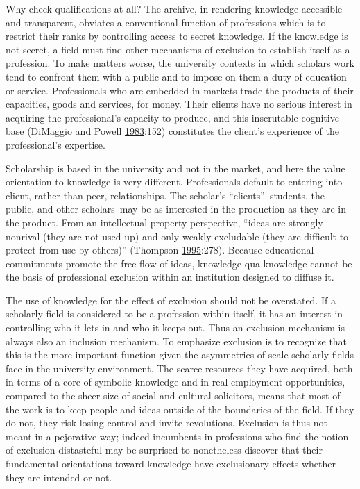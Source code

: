 \documentclass[]{book}
\theoremstyle{definition}
\theoremstyle{definition}
\theoremstyle{definition}
\theoremstyle{remark}
\begin{document}
Why check qualifications at all? The archive, in rendering knowledge
accessible and transparent, obviates a conventional function of
professions which is to restrict their ranks by controlling access to
secret knowledge. If the knowledge is not secret, a field must find
other mechanisms of exclusion to establish itself as a profession. To
make matters worse, the university contexts in which scholars work tend
to confront them with a public and to impose on them a duty of education
or service. Professionals who are embedded in markets trade the products
of their capacities, goods and services, for money. Their clients have
no serious interest in acquiring the professional's capacity to produce,
and this inscrutable cognitive base (DiMaggio and Powell
\protect\hyperlink{ref-DiMaggio1983Iron}{1983}:152) constitutes the
client's experience of the professional's expertise.

Scholarship is based in the university and not in the market, and here
the value orientation to knowledge is very different. Professionals
default to entering into client, rather than peer, relationships. The
scholar's ``clients''--students, the public, and other scholars--may be
as interested in the production as they are in the product. From an
intellectual property perspective, ``ideas are strongly nonrival (they
are not used up) and only weakly excludable (they are difficult to
protect from use by others)'' (Thompson
\protect\hyperlink{ref-Thompson1995Conceptions}{1995}:278). Because
educational commitments promote the free flow of ideas, knowledge qua
knowledge cannot be the basis of professional exclusion within an
institution designed to diffuse it.

The use of knowledge for the effect of exclusion should not be
overstated. If a scholarly field is considered to be a profession within
itself, it has an interest in controlling who it lets in and who it
keeps out. Thus an exclusion mechanism is always also an inclusion
mechanism. To emphasize exclusion is to recognize that this is the more
important function given the asymmetries of scale scholarly fields face
in the university environment. The scarce resources they have acquired,
both in terms of a core of symbolic knowledge and in real employment
opportunities, compared to the sheer size of social and cultural
solicitors, means that most of the work is to keep people and ideas
outside of the boundaries of the field. If they do not, they risk losing
control and invite revolutions. Exclusion is thus not meant in a
pejorative way; indeed incumbents in professions who find the notion of
exclusion distasteful may be surprised to nonetheless discover that
their fundamental orientations toward knowledge have exclusionary
effects whether they are intended or not.
\end{document}
